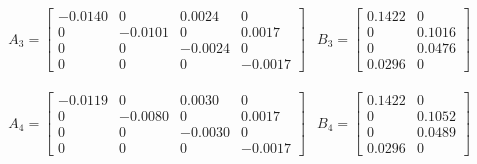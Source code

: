 \begin{align*} %
	& A_3 =
	\begin{bmatrix}
	   -0.0140 &       0 &   0.0024 &        0 \\
			0  & -0.0101  &       0  &  0.0017 \\
			0  &       0  & -0.0024  &       0 \\
			0  &       0  &       0  & -0.0017
	\end{bmatrix}
	& B_3 =
	\begin{bmatrix}
	    0.1422 &       0 \\
			0  &  0.1016 \\
			0  &  0.0476 \\
		0.0296 &       0 
	\end{bmatrix}
\end{align*}
		
\begin{align*} %
	& A_4 =
	\begin{bmatrix}
   -0.0119 &       0  &  0.0030 &        0 \\
		0  & -0.0080  &       0 &   0.0017 \\
		0  &       0  & -0.0030 &        0 \\
		0  &       0  &       0 &  -0.0017
	\end{bmatrix}
	& B_4 =
	\begin{bmatrix}
	0.1422 &       0 \\
		0  &  0.1052 \\
		0  &  0.0489 \\
	0.0296 &       0
	\end{bmatrix}
\end{align*}

